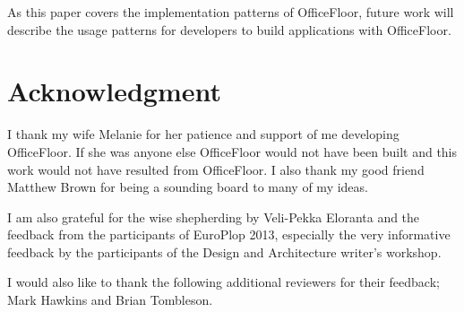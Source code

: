 \documentclass[prodmode]{style/acmlarge}
\begin{document}
As this paper covers the implementation patterns of OfficeFloor, future work
will describe the usage patterns for developers to build applications with
OfficeFloor.



\section*{Acknowledgment} 

I thank my wife Melanie for her patience and support of me developing
OfficeFloor.  If she was anyone else OfficeFloor would not have been built and
this work would not have resulted from OfficeFloor.  I also thank my good friend
Matthew Brown for being a sounding board to many of my ideas.

I am also grateful for the wise shepherding by Veli-Pekka Eloranta and the
feedback from the participants of EuroPlop 2013, especially the very informative
feedback by the participants of the Design and Architecture writer's workshop.

I would also like to thank the following additional reviewers for their
feedback; Mark Hawkins and Brian Tombleson.




\end{document}
